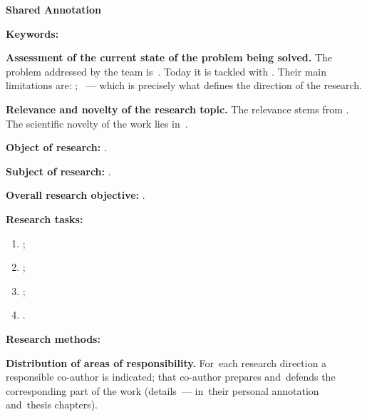 \documentclass[12pt,a4paper]{extarticle}
\begin{document}
\sloppy



\begin{center}
  \textbf{\large Shared Annotation}
\end{center}

\vspace{0.4em}

\noindent\textbf{Keywords:} 

\medskip
\noindent\textbf{Assessment of the current state of the problem being solved.} The problem addressed by the team is~. Today it is tackled with  \cite{example-en}. Their main limitations are: ; ~--- which is precisely what defines the direction of the research.

\medskip
\noindent\textbf{Relevance and novelty of the research topic.} The relevance stems from . The scientific novelty of the work lies in~.

\medskip
\noindent\textbf{Object of research:} .

\smallskip
\noindent\textbf{Subject of research:} .

\smallskip
\noindent\textbf{Overall research objective:} .

\medskip
\noindent\textbf{Research tasks:}
\begin{enumerate}[label=\arabic*), leftmargin=1.3cm, topsep=2pt, itemsep=2pt]
  \item {};
  \item {};
  \item {};
  \item {}.
\end{enumerate}

\medskip
\noindent\textbf{Research methods:} 

\medskip
\noindent\textbf{Distribution of areas of responsibility.} For~each research direction a responsible co-author is indicated; that co-author prepares and~defends the corresponding part of the work (details~--- in~their personal annotation and~thesis chapters).
\end{document}
